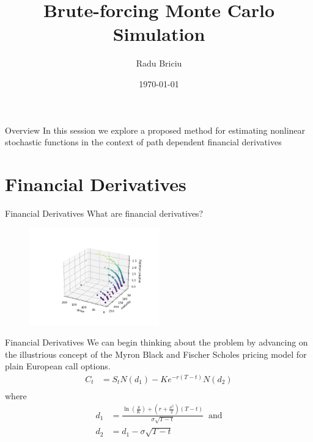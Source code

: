 \documentclass[aspectratio=169,xcolor=dvipsnames]{beamer}
\title{Brute-forcing Monte Carlo Simulation}
\author{Radu Briciu}
\institute
{
	BSc Finance (Hons) \\ 
	University of Westminster \\
	\vspace*{1em}
	City, University of London \\
	Faculty of Finance
}
\date{\today} %
\begin{document}
	
	\begin{frame}
		\titlepage
	\end{frame}
	
	\begin{frame}{Overview}
		In this session we explore a proposed method for estimating nonlinear stochastic functions in the context of path dependent financial derivatives
		\tableofcontents
	\end{frame}
	
	\section{Financial Derivatives}
	
	\begin{frame}{Financial Derivatives}
		What are financial derivatives?
		\begin{figure}[h]
			\centering
			\includegraphics[width=0.5\textwidth]{vix.png}
		\end{figure}
	\end{frame}
	
	\begin{frame}{Financial Derivatives}
		We can begin thinking about the problem by advancing on the illustrious concept of the Myron Black and Fischer Scholes pricing model for plain European call options.
		\begin{align}
			C_{t} &= S_{t} N(d_{1}) - K e^{-r(T-t)} N(d_{2}) \\
		\end{align} where
		\begin{align}
			d_{1} &= \frac{\ln(\frac{S}{K}) + (r+\frac{\sigma^{2}}{2})(T-t)}{\sigma\sqrt{T-t}} \; \; \text{and} \\
			d_{2} &= d_{1} - \sigma \sqrt{T-t}
		\end{align}
	\end{frame}
	
\end{document}
